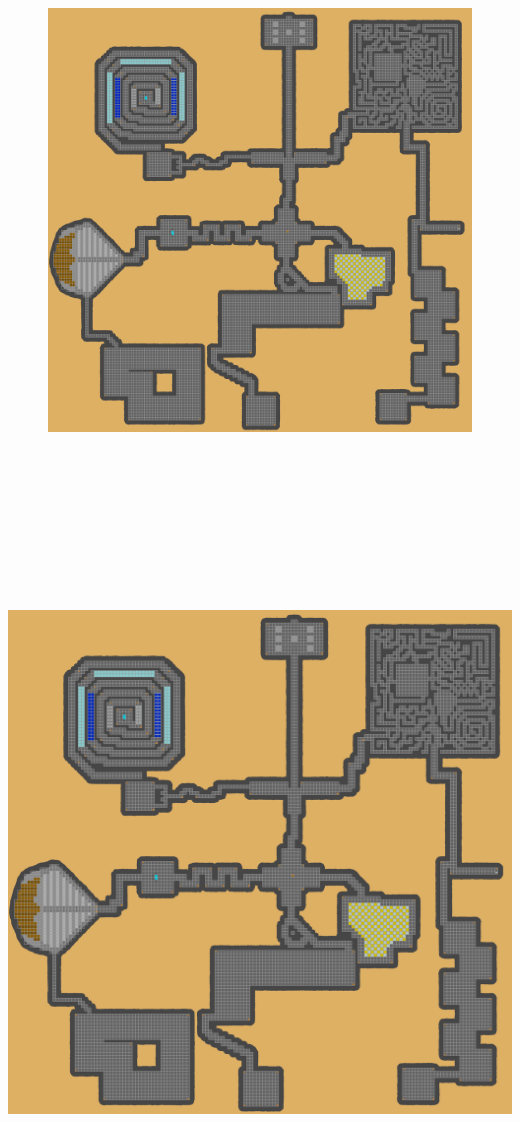 \documentclass[a4paper, landscape]{article}
\begin{document}
	\begin{figure}[H]
\includegraphics[trim = 4217 3240 0 1364, clip, height = 14cm, width = 28cm]{Dungeon_playersmap.png}
	\end{figure}
\clearpage
\includegraphics[trim = 3457 3701 760 749, clip, height = 19cm, width = 28cm]{Dungeon_playersmap.png}
\end{document}
